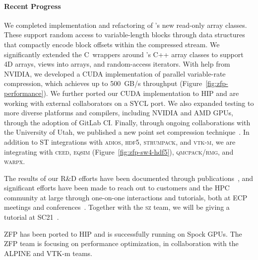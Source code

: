 \paragraph{Recent Progress}

We completed implementation and refactoring of \zfp's new read-only array classes.
These support random access to variable-length blocks through data structures that compactly encode block offsets within the compressed stream.
We significantly extended the C~wrappers around \zfp's C++ array classes to support 4D arrays, views into arrays, and random-access iterators.
With help from NVIDIA, we developed a CUDA implementation of parallel variable-rate compression, which achieves up to 500~GB/s throughput (Figure~\ref{fig:zfp-performance}).
We further ported our CUDA implementation to HIP and are working with external collaborators on a SYCL port.
We also expanded {\zfp} testing to more diverse platforms and compilers, including NVIDIA and AMD GPUs, through the adoption of GitLab CI.
Finally, through ongoing collaborations with the University of Utah, we published a new point set compression technique~\cite{zfp-ldav2021}.
In addition to ST integrations with \textsc{adios}, \textsc{hdf5}, \textsc{strumpack}, and \textsc{vtk-m}, we are integrating {\zfp} with \textsc{ceed}, \textsc{eqsim} (Figure~\ref{fig:zfp-sw4-hdf5}), \textsc{qmcpack}/\textsc{rmg}, and \textsc{warpx}.

The results of our R\&D efforts have been documented through publications~\cite{zfp-isc2017,zfp-jsm2017,zfp-sisc2019,zfp-drbsd2019,zfp-pdp2020,zfp-vis2020,zfp-ldav2021}, and significant efforts have been made to reach out to customers and the HPC community at large through one-on-one interactions and tutorials, both at ECP meetings and conferences~\cite{zfp-isc2017-tut,zfp-sc2017-tut,zfp-ep2018-tut,zfp-sc2018-tut,zfp-isc2019-tut,zfp-sc2019-tut,zfp-sc2020-tut,zfp-sc2020-pan}.  Together with the \textsc{sz} team, we will be giving a tutorial at SC21~\cite{zfp-sc2021-tut}.

ZFP has been ported to HIP and is successfully running on Spock GPUs.  The ZFP team is focusing on performance optimization, in collaboration with the ALPINE and VTK-m teams.  

